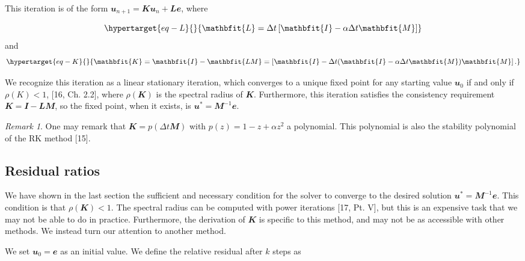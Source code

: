 \documentclass[
  letterpaper,
]{report}
\theoremstyle{plain}
\theoremstyle{definition}
\theoremstyle{definition}
\theoremstyle{remark}
\newtheorem*{remark}{Remark}
\begin{document}
This iteration is of the form
\(\mathbfit{u}_{n+1} =\mathbfit{Ku}_n + \mathbfit{Le}\), where

\begin{equation}\protect\hypertarget{eq-L}{}{
\mathbfit{L} = \Delta t\left[ \mathbfit{I} - \alpha \Delta t \mathbfit{M}\right]
}\label{eq-L}\end{equation} and
\begin{equation}\protect\hypertarget{eq-K}{}{
\mathbfit{K} = \mathbfit{I}- \mathbfit{LM} = \left[\mathbfit{I}- \Delta t(\mathbfit{I}- \alpha \Delta t \mathbfit{M})\mathbfit{M}\right].
}\label{eq-K}\end{equation}

We recognize this iteration as a linear stationary iteration, which
converges to a unique fixed point for any starting value
\(\mathbfit{u}_0\) if and only if \(\rho(K)<1\), {[}16, Ch. 2.2{]},
where \(\rho(\mathbfit{K})\) is the spectral radius of \(\mathbfit{K}\).
Furthermore, this iteration satisfies the consistency requirement
\(\mathbfit{K} = \mathbfit{I}-\mathbfit{LM}\), so the fixed point, when
it exists, is \(\mathbfit{u}^* = \mathbfit{M}^{-1}\mathbfit{e}\).

\begin{remark}

One may remark that \(\mathbfit{K} = p(\Delta t \mathbfit{M})\) with
\(p(z) = 1- z + \alpha z^2\) a polynomial. This polynomial is also the
stability polynomial of the RK method {[}15{]}.

\end{remark}

\hypertarget{residual-ratios}{%
\subsection{Residual ratios}\label{residual-ratios}}

We have shown in the last section the sufficient and necessary condition
for the solver to converge to the desired solution
\(\mathbfit{u}^* = \mathbfit{M}^{-1}\mathbfit{e}\). This condition is
that \(\rho(\mathbfit{K})<1\). The spectral radius can be computed with
power iterations {[}17, Pt. V{]}, but this is an expensive task that we
may not be able to do in practice. Furthermore, the derivation of
\(\mathbfit{K}\) is specific to this method, and may not be as
accessible with other methods. We instead turn our attention to another
method.

We set \(\mathbfit{u}_0 = \mathbfit{e}\) as an initial value. We define
the relative residual after \(k\) steps as
\end{document}
